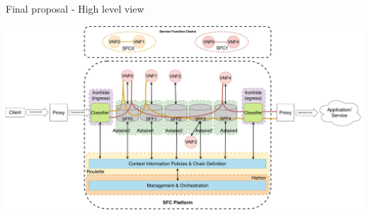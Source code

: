 \begin{frame}{Final proposal - High level view}


  \includegraphics[page=1,scale=0.2]{res/images/finalreview}

\end{frame}